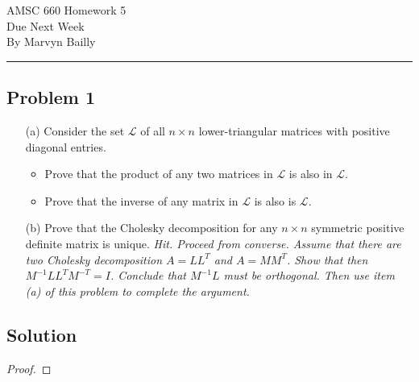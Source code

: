 \documentclass[12pt]{report}
\begin{document}
\large
\begin{center}
AMSC 660 Homework 5\\
Due Next Week\\
By Marvyn Bailly\\
\end{center}
\normalsize
\hrule


\def\L{{\mathcal{L}}}



\begin{problem}%
\subsection*{Problem 1}


\begin{enumerate}
    \item [(a)] Consider the set $\L$ of all $n \times n$ lower-triangular matrices with positive diagonal entries.
    \begin{itemize}
        \item Prove that the product of any two matrices in $\L$ is also in $\L$.
        \item Prove that the inverse of any matrix in $\L$ is also is $\L$.
    \end{itemize}

    \item [(b)] Prove that the Cholesky decomposition for any $n \times n$ symmetric positive definite matrix is unique. \textit{Hit. Proceed from converse. Assume that there are two Cholesky decomposition $A = LL^T$ and $A = MM^T$. Show that then $M^{-1}LL^TM^{-T} =  I$. Conclude that $M^{-1}L$ must be orthogonal. Then use item (a) of this problem to complete the argument.}
\end{enumerate}

\subsection*{Solution}
\begin{proof}


\end{proof}
\end{problem}
\end{document}
